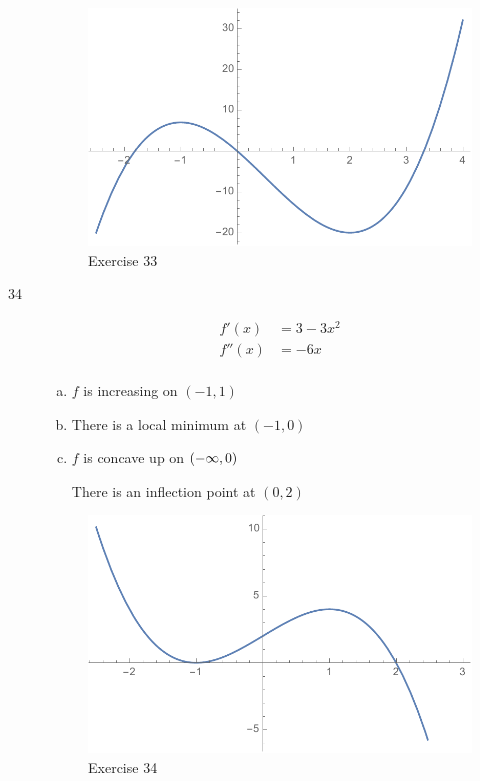 \documentclass[letterpaper, landscape]{exam}
\begin{document}
\begin{description}
      \begin{figure}[H]
        \centering
        \includegraphics[scale = 0.6]{ex33.pdf}
        \caption{Exercise 33}
        \label{fig:ex33}
      \end{figure}

    \newpage

    \item[34]
      \begin{align*}
        f'(x)  & = 3 - 3x^2 \\
        f''(x) & = -6x \\
      \end{align*}

      \begin{enumerate}[(a)]
        \item $f$ is increasing on $(-1, 1)$

        \item There is a local minimum at $(-1, 0)$ 

        \item $f$ is concave up on $\del{ -\infty, 0 }$ 
          
          There is an inflection point at $(0, 2)$ 

      \end{enumerate}

      \begin{figure}[H]
        \centering
        \includegraphics[scale = 0.6]{ex34.pdf}
        \caption{Exercise 34}
        \label{fig:ex34}
      \end{figure}


\end{description}
\end{document}
